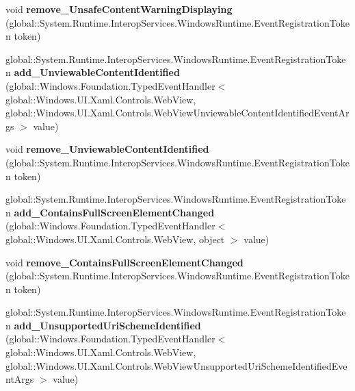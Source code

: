 \begin{DoxyCompactItemize}
void {\bfseries remove\+\_\+\+Unsafe\+Content\+Warning\+Displaying} (global\+::\+System.\+Runtime.\+Interop\+Services.\+Windows\+Runtime.\+Event\+Registration\+Token token)
\item 
\mbox{\label{class_windows_1_1_u_i_1_1_xaml_1_1_controls_1_1_web_view_ab93454d0958bb3d24f93b42ff82dca54}} 
global\+::\+System.\+Runtime.\+Interop\+Services.\+Windows\+Runtime.\+Event\+Registration\+Token {\bfseries add\+\_\+\+Unviewable\+Content\+Identified} (global\+::\+Windows.\+Foundation.\+Typed\+Event\+Handler$<$ global\+::\+Windows.\+U\+I.\+Xaml.\+Controls.\+Web\+View, global\+::\+Windows.\+U\+I.\+Xaml.\+Controls.\+Web\+View\+Unviewable\+Content\+Identified\+Event\+Args $>$ value)
\item 
\mbox{\label{class_windows_1_1_u_i_1_1_xaml_1_1_controls_1_1_web_view_ad2241c477e89085a1d4a943964cbe8ba}} 
void {\bfseries remove\+\_\+\+Unviewable\+Content\+Identified} (global\+::\+System.\+Runtime.\+Interop\+Services.\+Windows\+Runtime.\+Event\+Registration\+Token token)
\item 
\mbox{\label{class_windows_1_1_u_i_1_1_xaml_1_1_controls_1_1_web_view_adb738473279f6b2a74d4f5ce1e24226c}} 
global\+::\+System.\+Runtime.\+Interop\+Services.\+Windows\+Runtime.\+Event\+Registration\+Token {\bfseries add\+\_\+\+Contains\+Full\+Screen\+Element\+Changed} (global\+::\+Windows.\+Foundation.\+Typed\+Event\+Handler$<$ global\+::\+Windows.\+U\+I.\+Xaml.\+Controls.\+Web\+View, object $>$ value)
\item 
\mbox{\label{class_windows_1_1_u_i_1_1_xaml_1_1_controls_1_1_web_view_a9a65a7cbd1489ecabc667dacbebd3a9b}} 
void {\bfseries remove\+\_\+\+Contains\+Full\+Screen\+Element\+Changed} (global\+::\+System.\+Runtime.\+Interop\+Services.\+Windows\+Runtime.\+Event\+Registration\+Token token)
\item 
\mbox{\label{class_windows_1_1_u_i_1_1_xaml_1_1_controls_1_1_web_view_a8e58301687dd3cd515b89035cc513c38}} 
global\+::\+System.\+Runtime.\+Interop\+Services.\+Windows\+Runtime.\+Event\+Registration\+Token {\bfseries add\+\_\+\+Unsupported\+Uri\+Scheme\+Identified} (global\+::\+Windows.\+Foundation.\+Typed\+Event\+Handler$<$ global\+::\+Windows.\+U\+I.\+Xaml.\+Controls.\+Web\+View, global\+::\+Windows.\+U\+I.\+Xaml.\+Controls.\+Web\+View\+Unsupported\+Uri\+Scheme\+Identified\+Event\+Args $>$ value)

\end{DoxyCompactItemize}
